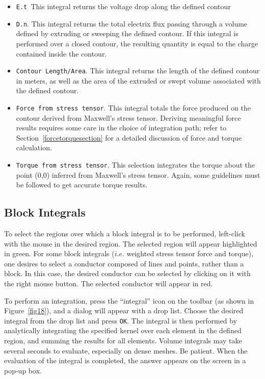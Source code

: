\documentclass[12pt]{report}
\begin{document}
\begin{itemize}


\item \texttt{E.t }This integral returns the voltage drop along the defined
contour

\item \texttt{D.n}. This integral returns the total electrix flux passing through
a volume defined by extruding or sweeping the defined contour. If this
integral is performed over a closed contour, the resulting quantity is equal
to the charge contained inside the contour.

\item \texttt{Contour Length/Area}. This integral returns the length of the
defined contour in meters, as well as the area of the extruded or swept
volume associated with the defined contour.

\item \texttt{Force from stress tensor}. This integral totals the force produced
on the contour derived from Maxwell's stress tensor. Deriving
meaningful force results requires some care in the choice of
integration path; refer to Section~\ref{forcetorquesection} for a
detailed discussion of force and torque calculation.

\item \texttt{Torque from stress tensor}. This selection integrates the torque
about the point (0,0) inferred from Maxwell's stress tensor. Again,
some guidelines must be followed to get accurate torque results.

\end{itemize}



\subsection{Block Integrals}

To select the regions over which a block integral is to be performed,
left-click with the mouse in the desired region. The selected region will
appear highlighted in green. For some block integrals ($i.e.$ weighted stress
tensor force and torque), one desires to select a conductor composed of
lines and points, rather than a block. In this case, the desired conductor
can be selected by clicking on it with the right mouse button. The selected
conductor will appear in red.

To perform an integration, press the ``integral'' icon on the
toolbar (as shown in Figure~\ref{fig18}), and a dialog will appear
with a drop list. Choose the desired integral from the drop list
and press \texttt{OK}. The integral is then performed by
analytically integrating the specified kernel over each element in
the defined region, and summing the results for all elements.
Volume integrals may take several seconds to evaluate, especially
on dense meshes. Be patient. When the evaluation of the integral is
completed, the answer appears on the screen in a pop-up box.
\end{document}
